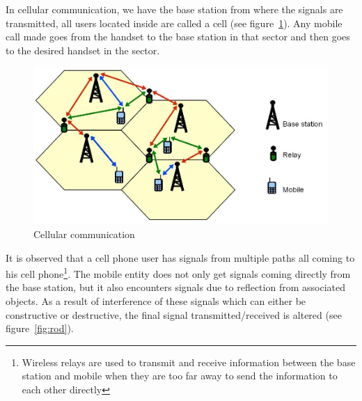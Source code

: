 In cellular communication, we have the base station from where the signals are transmitted, all users located inside are called a cell (see figure~\ref{fig:rrsadafig1}). Any mobile call made goes from the handset to the base station in that sector and then goes to the desired handset in the sector.
\begin{figure}[h]
\centering
\includegraphics[scale=0.3]{./graphics/RR_sada_fig1}
\caption{Cellular communication}
\label{fig:rrsadafig1}
\end{figure}

It is observed that a cell phone user has signals from multiple paths all coming to his cell phone\footnote{Wireless relays are used to transmit and receive information between the base station and mobile when they are too far away to send the information to each other directly}. The mobile entity does not only get signals coming directly from the base station, but it also encounters signals due to reflection from associated objects. As a result of interference of these signals which can either be constructive or destructive, the final signal transmitted/received is altered (see figure~\ref{fig:rod}). 

